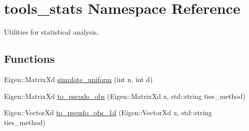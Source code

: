 \hypertarget{namespacetools__stats}{}\section{tools\+\_\+stats Namespace Reference}
\label{namespacetools__stats}


Utilities for statistical analysis.  


\subsection*{Functions}
\begin{DoxyCompactItemize}
\item 
Eigen\+::\+Matrix\+Xd \hyperlink{namespacetools__stats_ad857f9c70a10a498f3c449225500f4c0}{simulate\+\_\+uniform} (int n, int d)
\item 
Eigen\+::\+Matrix\+Xd \hyperlink{namespacetools__stats_a88048bc643d51f30f099c33eb2f61598}{to\+\_\+pseudo\+\_\+obs} (Eigen\+::\+Matrix\+Xd x, std\+::string ties\+\_\+method)
\item 
Eigen\+::\+Vector\+Xd \hyperlink{namespacetools__stats_af09c24563535c110aea492a30eed3d3e}{to\+\_\+pseudo\+\_\+obs\+\_\+1d} (Eigen\+::\+Vector\+Xd x, std\+::string ties\+\_\+method)
\end{DoxyCompactItemize}
